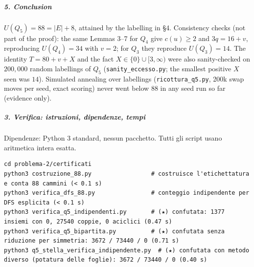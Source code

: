 \documentclass[11pt,a4paper]{article}
\begin{document}
\subparagraph{5. Conclusion}\label{conclusion}

\(U(Q_5)=88=|E|+8\), attained by the labelling in §4. Consistency checks
(not part of the proof): the same Lemmas 3--7 for \(Q_4\) give
\(c(u)\ge2\) and \(3q=16+v\), reproducing \(U(Q_4)=34\) with \(v=2\);
for \(Q_3\) they reproduce \(U(Q_3)=14\). The identity \(T=80+v+X\) and
the fact \(X\in\{0\}\cup[3,\infty)\) were also sanity-checked on
\(200{,}000\) random labellings of \(Q_5\) (\texttt{sanity\_eccesso.py};
the smallest positive \(X\) seen was \(14\)). Simulated annealing over
labellings (\texttt{ricottura\_q5.py}, 200k swap moves per seed, exact
scoring) never went below \(88\) in any seed run so far (evidence only).

\subparagraph{3. Verifica: istruzioni, dipendenze,
tempi}\label{verifica-istruzioni-dipendenze-tempi}

Dipendenze: Python 3 standard, nessun pacchetto. Tutti gli script usano
aritmetica intera esatta.

\begin{verbatim}
cd problema-2/certificati
python3 costruzione_88.py                 # costruisce l'etichettatura e conta 88 cammini (< 0.1 s)
python3 verifica_dfs_88.py                # conteggio indipendente per DFS esplicita (< 0.1 s)
python3 verifica_q5_indipendenti.py       # (★) confutata: 1377 insiemi con 0, 27540 coppie, 0 aciclici (0.47 s)
python3 verifica_q5_bipartita.py          # (★) confutata senza riduzione per simmetria: 3672 / 73440 / 0 (0.71 s)
python3 q5_stella_verifica_indipendente.py  # (★) confutata con metodo diverso (potatura delle foglie): 3672 / 73440 / 0 (0.40 s)
\end{verbatim}
\end{document}
